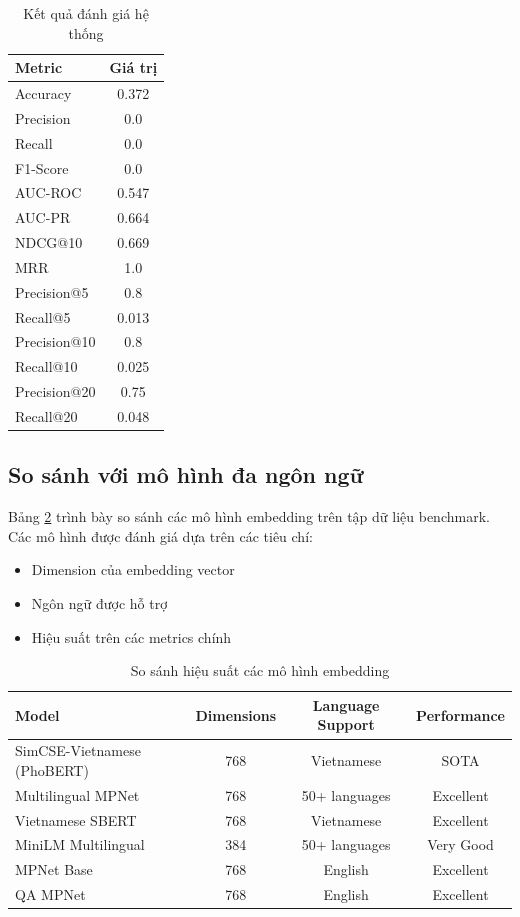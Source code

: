 \begin{table}[H]
\centering
\caption{Kết quả đánh giá hệ thống}
\label{tab:evaluation-results}
\begin{tabular}{|l|c|}
\hline
\textbf{Metric} & \textbf{Giá trị} \\
\hline
Accuracy & 0.372 \\
Precision & 0.0 \\
Recall & 0.0 \\
F1-Score & 0.0 \\
AUC-ROC & 0.547 \\
AUC-PR & 0.664 \\
NDCG@10 & 0.669 \\
MRR & 1.0 \\
Precision@5 & 0.8 \\
Recall@5 & 0.013 \\
Precision@10 & 0.8 \\
Recall@10 & 0.025 \\
Precision@20 & 0.75 \\
Recall@20 & 0.048 \\
\hline
\end{tabular}
\end{table}

\subsection{So sánh với mô hình đa ngôn ngữ}

Bảng \ref{tab:model-comparison} trình bày so sánh các mô hình embedding trên tập dữ liệu benchmark. Các mô hình được đánh giá dựa trên các tiêu chí:

\begin{itemize}
    \item Dimension của embedding vector
    \item Ngôn ngữ được hỗ trợ
    \item Hiệu suất trên các metrics chính
\end{itemize}

\begin{table}[H]
\centering
\caption{So sánh hiệu suất các mô hình embedding}
\label{tab:model-comparison}
\begin{tabular}{|l|c|c|c|}
\hline
\textbf{Model} & \textbf{Dimensions} & \textbf{Language Support} & \textbf{Performance} \\
\hline
SimCSE-Vietnamese (PhoBERT) & 768 & Vietnamese & SOTA \\
Multilingual MPNet & 768 & 50+ languages & Excellent \\
Vietnamese SBERT & 768 & Vietnamese & Excellent \\
MiniLM Multilingual & 384 & 50+ languages & Very Good \\
MPNet Base & 768 & English & Excellent \\
QA MPNet & 768 & English & Excellent \\
\hline
\end{tabular}
\end{table}

